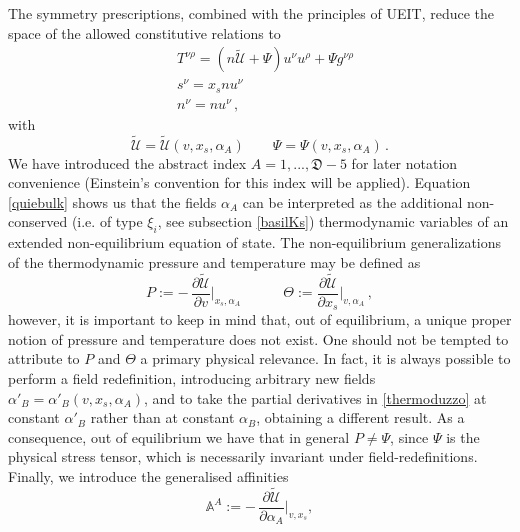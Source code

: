 \documentclass[a4paper, amsfonts, amssymb, amsmath, reprint, twocolumn, showkeys, nofootinbib]{revtex4-2}
\begin{document}
The symmetry prescriptions, combined with the principles of UEIT, reduce the space of the allowed constitutive relations to
\begin{equation}\label{iobulko}
\begin{split}
 & T^{\nu \rho} = (n \tilde{\mathcal{U}} +\Psi)u^\nu u^\rho + \Psi g^{\nu \rho}
 \\ %
 & s^\nu = x_s nu^\nu 
 \\ %
 & n^\nu = n u^\nu \, ,
\end{split}
\end{equation}
with
\begin{equation}\label{quiebulk}
\tilde{\mathcal{U}}=\tilde{\mathcal{U}}(v,x_s,\alpha_A)   \quad \quad   \Psi=\Psi(v,x_s,\alpha_A) \, .
\end{equation} 
We have introduced the abstract index $A=1,...,\mathfrak{D}-5$ for later notation convenience (Einstein's convention for this index will be applied). Equation \eqref{quiebulk} shows us that the fields $\alpha_A$ can be interpreted as the additional non-conserved (i.e. of type $\xi_i$, see subsection \ref{basilKs}) thermodynamic variables of an extended non-equilibrium equation of state. 
The non-equilibrium generalizations of the thermodynamic pressure and temperature may be defined as
\begin{equation}\label{thermoduzzo}
P := - \, \dfrac{\partial \tilde{\mathcal{U}}}{\partial v} \bigg|_{x_s,\alpha_A}   \quad \quad \quad   
\Theta := \dfrac{\partial \tilde{\mathcal{U}}}{\partial x_s} \bigg|_{v,\alpha_A} \, ,   
\end{equation}
however, it is important to keep in mind that, out of equilibrium, a unique proper notion of pressure and temperature does not exist. One should not be tempted to attribute to $P$ and $\Theta$ a primary physical relevance. 
In fact, it is always possible to perform a field redefinition, introducing arbitrary new fields $\alpha'_B = \alpha'_B (v,x_s,\alpha_A)$, and to take the partial derivatives in \eqref{thermoduzzo} at constant $\alpha'_B$ rather than at constant $\alpha_B$, obtaining a different result. 
As a consequence, out of equilibrium we have that in general $P \neq \Psi$, since $\Psi$ is the physical stress tensor, which is necessarily invariant under field-redefinitions. 
Finally, we introduce the generalised affinities
\begin{equation}\label{AQAQA}
\mathbb{A}^A := - \, \dfrac{\partial \tilde{\mathcal{U}}}{\partial \alpha_A} \bigg|_{v,x_s},
\end{equation}
\end{document}
